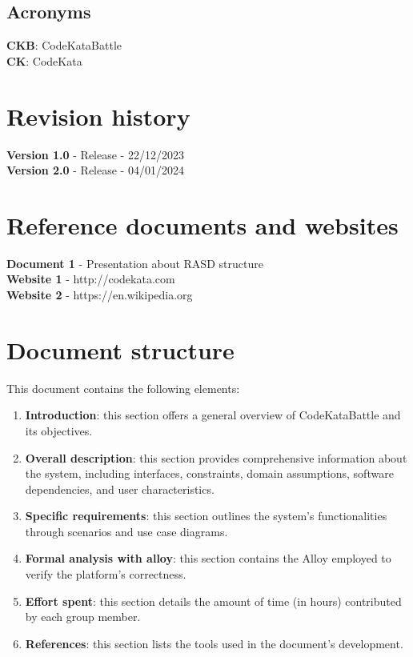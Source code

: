 \documentclass[12pt, a4paper]{report}
\begin{document}
    \subsection{Acronyms}
    \textbf{CKB}: CodeKataBattle \\
    \textbf{CK}: CodeKata
    
    \section{Revision history}
    \textbf{Version 1.0} - Release - 22/12/2023 \\
    \textbf{Version 2.0} - Release - 04/01/2024

    \section{Reference documents and websites}
    \textbf{Document 1} - Presentation about RASD structure \\
    \textbf{Website 1} - http://codekata.com \\
    \textbf{Website 2} - https://en.wikipedia.org

    \section{Document structure}
    This document contains the following elements: 
    \begin{enumerate}
        \item \textbf{Introduction}: this section offers a general overview of CodeKataBattle and its objectives.
        \item \textbf{Overall description}: this section provides comprehensive information about the system, including interfaces, constraints, domain assumptions, software dependencies, and user characteristics.
        \item \textbf{Specific requirements}: this section outlines the system's functionalities through scenarios and use case diagrams.
        \item \textbf{Formal analysis with alloy}: this section contains the Alloy employed to verify the platform's correctness.
        \item \textbf{Effort spent}: this section details the amount of time (in hours) contributed by each group member.
        \item \textbf{References}: this section lists the tools used in the document's development.
    \end{enumerate}
\end{document}
